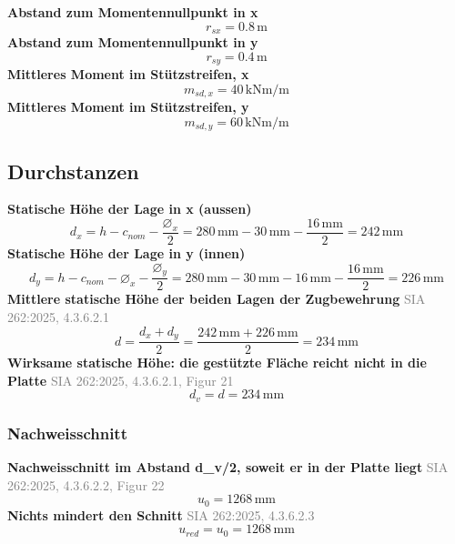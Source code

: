 \documentclass[11pt,a4paper]{article}
\newcommand{\normref}[1]{{\small\textcolor{gray}{#1}}}
\begin{document}
\noindent\textbf{Abstand zum Momentennullpunkt in x}
\begin{equation*}
r_{sx} = 0.8\,\mathrm{m}
\end{equation*}
\noindent\textbf{Abstand zum Momentennullpunkt in y}
\begin{equation*}
r_{sy} = 0.4\,\mathrm{m}
\end{equation*}
\noindent\textbf{Mittleres Moment im Stützstreifen, x}
\begin{equation*}
m_{sd,x} = 40\,\mathrm{kNm}/\mathrm{m}
\end{equation*}
\noindent\textbf{Mittleres Moment im Stützstreifen, y}
\begin{equation*}
m_{sd,y} = 60\,\mathrm{kNm}/\mathrm{m}
\end{equation*}
\subsection{Durchstanzen}
\noindent\textbf{Statische Höhe der Lage in x (aussen)}
\begin{equation*}
d_x = h - c_{nom} - \frac{\varnothing_x}{2} = 280\,\mathrm{mm} - 30\,\mathrm{mm} - \frac{16\,\mathrm{mm}}{2} = 242\,\mathrm{mm}
\end{equation*}
\noindent\textbf{Statische Höhe der Lage in y (innen)}
\begin{equation*}
d_y = h - c_{nom} - \varnothing_x - \frac{\varnothing_y}{2} = 280\,\mathrm{mm} - 30\,\mathrm{mm} - 16\,\mathrm{mm} - \frac{16\,\mathrm{mm}}{2} = 226\,\mathrm{mm}
\end{equation*}
\noindent\textbf{Mittlere statische Höhe der beiden Lagen der Zugbewehrung} \hfill \normref{SIA 262:2025, 4.3.6.2.1}
\begin{equation*}
d = \frac{d_x + d_y}{2} = \frac{242\,\mathrm{mm} + 226\,\mathrm{mm}}{2} = 234\,\mathrm{mm}
\end{equation*}
\noindent\textbf{Wirksame statische Höhe: die gestützte Fläche reicht nicht in die Platte} \hfill \normref{SIA 262:2025, 4.3.6.2.1, Figur 21}
\begin{equation*}
d_v = d = 234\,\mathrm{mm}
\end{equation*}
\subsubsection{Nachweisschnitt}
\noindent\textbf{Nachweisschnitt im Abstand d\_v/2, soweit er in der Platte liegt} \hfill \normref{SIA 262:2025, 4.3.6.2.2, Figur 22}
\begin{equation*}
u_0 = 1268\,\mathrm{mm}
\end{equation*}
\noindent\textbf{Nichts mindert den Schnitt} \hfill \normref{SIA 262:2025, 4.3.6.2.3}
\begin{equation*}
u_{red} = u_0 = 1268\,\mathrm{mm}
\end{equation*}
\end{document}
